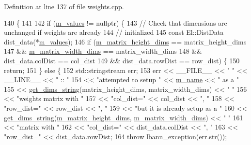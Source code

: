 Definition at line 137 of file weights.\+cpp.


\begin{DoxyCode}
140                                              \{
141 
142   \textcolor{keywordflow}{if} (\hyperlink{classlbann_1_1weights_a6b2df671b6d4c4dd595477971eea0543}{m\_values} != \textcolor{keyword}{nullptr}) \{
143     \textcolor{comment}{// Check that dimensions are unchanged if weights are already}
144     \textcolor{comment}{// initialized}
145     \textcolor{keyword}{const} El::DistData dist\_data(*\hyperlink{classlbann_1_1weights_a6b2df671b6d4c4dd595477971eea0543}{m\_values});
146     \textcolor{keywordflow}{if} (\hyperlink{classlbann_1_1weights_a9287dfbd8a7e4a9f5e0d6371d43ee92f}{m\_matrix\_height\_dims} == matrix\_height\_dims
147         && \hyperlink{classlbann_1_1weights_a8317a198bc5b4cd6bee2c806eefd1f12}{m\_matrix\_width\_dims} == matrix\_width\_dims
148         && dist\_data.colDist == col\_dist
149         && dist\_data.rowDist == row\_dist) \{
150       \textcolor{keywordflow}{return};
151     \} \textcolor{keywordflow}{else} \{
152       std::stringstream err;
153       err << \_\_FILE\_\_ << \textcolor{stringliteral}{" "} << \_\_LINE\_\_ << \textcolor{stringliteral}{" :: "}
154           << \textcolor{stringliteral}{"attempted to setup "} << \hyperlink{classlbann_1_1weights_a08abf0bb29aa47be21bfc7473b4b9b99}{m\_name} << \textcolor{stringliteral}{" as a "}
155           << \hyperlink{classlbann_1_1weights_ac15d39b1d887c8ff927b0c29f667e752}{get\_dims\_string}(matrix\_height\_dims, matrix\_width\_dims) << \textcolor{stringliteral}{" "}
156           << \textcolor{stringliteral}{"weights matrix with "}
157           << \textcolor{stringliteral}{"col\_dist="} << col\_dist << \textcolor{stringliteral}{", "}
158           << \textcolor{stringliteral}{"row\_dist="} << row\_dist << \textcolor{stringliteral}{", "}
159           << \textcolor{stringliteral}{"but it is already setup as a "}
160           << \hyperlink{classlbann_1_1weights_ac15d39b1d887c8ff927b0c29f667e752}{get\_dims\_string}(\hyperlink{classlbann_1_1weights_a9287dfbd8a7e4a9f5e0d6371d43ee92f}{m\_matrix\_height\_dims}, 
      \hyperlink{classlbann_1_1weights_a8317a198bc5b4cd6bee2c806eefd1f12}{m\_matrix\_width\_dims}) << \textcolor{stringliteral}{" "}
161           << \textcolor{stringliteral}{"matrix with "}
162           << \textcolor{stringliteral}{"col\_dist="} << dist\_data.colDist << \textcolor{stringliteral}{", "}
163           << \textcolor{stringliteral}{"row\_dist="} << dist\_data.rowDist;
164       \textcolor{keywordflow}{throw} lbann\_exception(err.str());

\end{DoxyCode}
